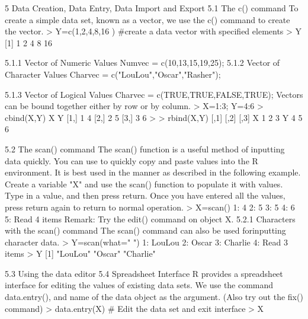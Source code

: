 
5 Data Creation, Data Entry, Data Import and Export
5.1 The c() command
To create a simple data set, known as a vector, we use the c() command to create the vector.
> Y=c(1,2,4,8,16 ) #create a data vector with specified elements
> Y
[1] 1 2 4 8 16

5.1.1 Vector of Numeric Values
Numvec = c(10,13,15,19,25);
5.1.2 Vector of Character Values
Charvec = c("LouLou","Oscar","Rasher");


5.1.3 Vector of Logical Values
Charvec = c(TRUE,TRUE,FALSE,TRUE);
Vectors can be bound together either by row or by column.
> X=1:3; Y=4:6
> cbind(X,Y)
X Y
[1,] 1 4
[2,] 2 5
[3,] 3 6
>
> rbind(X,Y)
[,1] [,2] [,3]
X 1 2 3
Y 4 5 6

5.2 The scan() command
The scan() function is a useful method of inputting data quickly. You can use to quickly copy
and paste values into the R environment. It is best used in the manner as described in the
following example. Create a variable "X" and use the scan() function to populate it with
values. Type in a value, and then press return. Once you have entered all the values, press
return again to return to normal operation.
> X=scan()
1: 4
2: 5
3: 5
4: 6
5:
Read 4 items
Remark: Try the edit() command on object X.
5.2.1 Characters with the scan() command
The scan() command can also be used forinputting character data.
> Y=scan(what=" ")
1: LouLou
2: Oscar
3: Charlie
4:
Read 3 items
> Y
[1] "LouLou" "Oscar" "Charlie"

5.3 Using the data editor
5.4 Spreadsheet Interface
R provides a spreadsheet interface for editing the values of existing data sets. We use the
command data.entry(), and name of the data object as the argument. (Also try out the
fix() command)
> data.entry(X) # Edit the data set and exit interface
> X


